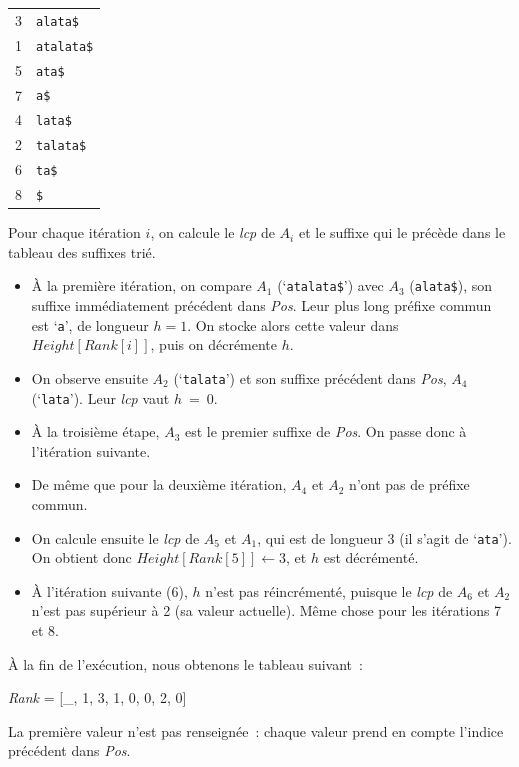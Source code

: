 \documentclass[a4paper,10pt]{article}
\begin{document}
\footnotesize
\begin{tabular}{rl}
3 & \texttt{alata\$}\\
1 & \texttt{atalata\$}\\
5 & \texttt{ata\$}\\
7 & \texttt{a\$}\\
4 & \texttt{lata\$}\\
2 & \texttt{talata\$}\\
6 & \texttt{ta\$}\\
8 & \texttt{\$}\\
\end{tabular}
\normalsize

Pour chaque itération $i$, on calcule le \textit{lcp} de $A_i$ et le
suffixe qui le précède dans le tableau des suffixes trié.

\begin{itemize}
\item À la première itération, on compare $A_1$ (`\texttt{atalata\$}') avec
$A_3$ (\texttt{alata\$}), son suffixe immédiatement précédent dans
\textit{Pos}. Leur plus long préfixe commun est `\texttt{a}', de
longueur $h = 1$. On stocke alors cette valeur dans
$\mathit{Height}[\mathit{Rank}[i]]$, puis on décrémente $h$.

\item On observe ensuite $A_2$ (`\texttt{talata}') et son suffixe précédent
dans \textit{Pos}, $A_4$ (`\texttt{lata}'). Leur \textit{lcp} vaut
$h~=~0$.

\item À la troisième étape, $A_3$ est le premier suffixe de \textit{Pos}. On
passe donc à l'itération suivante.

\item De même que pour la deuxième itération, $A_4$ et $A_2$ n'ont pas de
préfixe commun.

\item On calcule ensuite le \textit{lcp} de $A_5$ et $A_1$, qui est de
longueur 3 (il s'agit de `\texttt{ata}'). On obtient donc
$\mathit{Height}[\mathit{Rank}[5]] ← 3$, et $h$ est décrémenté.

\item À l'itération suivante (6), $h$ n'est pas réincrémenté, puisque le
\textit{lcp} de $A_6$ et $A_2$ n'est pas supérieur à 2 (sa valeur
actuelle). Même chose pour les itérations 7 et 8.
\end{itemize}

À la fin de l'exécution, nous obtenons le tableau suivant~:
\begin{center}
  \textit{Rank} = [\_, 1, 3, 1, 0, 0, 2, 0]
\end{center}
La première valeur n'est pas renseignée~: chaque valeur prend en
compte l'indice précédent dans \textit{Pos}.\\ \hfill \\
\end{document}
